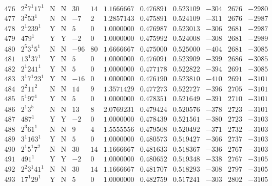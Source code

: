 \documentclass[11pt,reqno,a4letter]{article}
\numberwithin{figure}{section}
\numberwithin{table}{section}
\theoremstyle{plain}
\numberwithin{theorem}{section}
\theoremstyle{definition}
\begin{document}
\begin{table}[h!]
\begin{equation*}
{\begin{array}{cc|cc|ccc|cc|ccc}
 476 & 2^2 7^1 17^1 & \text{N} & \text{N} & 30 & 14 & 1.1666667 & 0.476891 & 0.523109 & -304 & 2676 & -2980 \\
 477 & 3^2 53^1 & \text{N} & \text{N} & -7 & 2 & 1.2857143 & 0.475891 & 0.524109 & -311 & 2676 & -2987 \\
 478 & 2^1 239^1 & \text{Y} & \text{N} & 5 & 0 & 1.0000000 & 0.476987 & 0.523013 & -306 & 2681 & -2987 \\
 479 & 479^1 & \text{Y} & \text{Y} & -2 & 0 & 1.0000000 & 0.475992 & 0.524008 & -308 & 2681 & -2989 \\
 480 & 2^5 3^1 5^1 & \text{N} & \text{N} & -96 & 80 & 1.6666667 & 0.475000 & 0.525000 & -404 & 2681 & -3085 \\
 481 & 13^1 37^1 & \text{Y} & \text{N} & 5 & 0 & 1.0000000 & 0.476091 & 0.523909 & -399 & 2686 & -3085 \\
 482 & 2^1 241^1 & \text{Y} & \text{N} & 5 & 0 & 1.0000000 & 0.477178 & 0.522822 & -394 & 2691 & -3085 \\
 483 & 3^1 7^1 23^1 & \text{Y} & \text{N} & -16 & 0 & 1.0000000 & 0.476190 & 0.523810 & -410 & 2691 & -3101 \\
 484 & 2^2 11^2 & \text{N} & \text{N} & 14 & 9 & 1.3571429 & 0.477273 & 0.522727 & -396 & 2705 & -3101 \\
 485 & 5^1 97^1 & \text{Y} & \text{N} & 5 & 0 & 1.0000000 & 0.478351 & 0.521649 & -391 & 2710 & -3101 \\
 486 & 2^1 3^5 & \text{N} & \text{N} & 13 & 8 & 2.0769231 & 0.479424 & 0.520576 & -378 & 2723 & -3101 \\
 487 & 487^1 & \text{Y} & \text{Y} & -2 & 0 & 1.0000000 & 0.478439 & 0.521561 & -380 & 2723 & -3103 \\
 488 & 2^3 61^1 & \text{N} & \text{N} & 9 & 4 & 1.5555556 & 0.479508 & 0.520492 & -371 & 2732 & -3103 \\
 489 & 3^1 163^1 & \text{Y} & \text{N} & 5 & 0 & 1.0000000 & 0.480573 & 0.519427 & -366 & 2737 & -3103 \\
 490 & 2^1 5^1 7^2 & \text{N} & \text{N} & 30 & 14 & 1.1666667 & 0.481633 & 0.518367 & -336 & 2767 & -3103 \\
 491 & 491^1 & \text{Y} & \text{Y} & -2 & 0 & 1.0000000 & 0.480652 & 0.519348 & -338 & 2767 & -3105 \\
 492 & 2^2 3^1 41^1 & \text{N} & \text{N} & 30 & 14 & 1.1666667 & 0.481707 & 0.518293 & -308 & 2797 & -3105 \\
 493 & 17^1 29^1 & \text{Y} & \text{N} & 5 & 0 & 1.0000000 & 0.482759 & 0.517241 & -303 & 2802 & -3105 \\

\end{array}}
\end{equation*}
\end{table}
\end{document}
